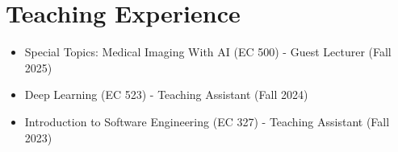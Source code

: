 \section{ Teaching Experience }
\begin{itemize}[itemsep=0pt, parsep=0pt]
    \item Special Topics: Medical Imaging With AI (EC 500) - Guest Lecturer (Fall 2025)
    \item Deep Learning (EC 523) - Teaching Assistant (Fall 2024)
    \item Introduction to Software Engineering (EC 327) - Teaching Assistant (Fall 2023)
    
\end{itemize}




